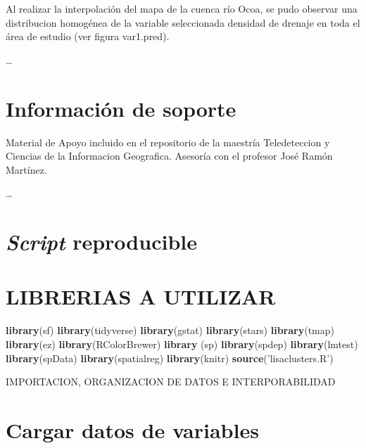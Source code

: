 \documentclass[11pt,]{article}
\newenvironment{Shaded}{\begin{snugshade}}{\end{snugshade}}
\newcommand{\KeywordTok}[1]{\textcolor[rgb]{0.13,0.29,0.53}{\textbf{#1}}}
\newcommand{\StringTok}[1]{\textcolor[rgb]{0.31,0.60,0.02}{#1}}
\newcommand{\NormalTok}[1]{#1}
\begin{document}
Al realizar la interpolación del mapa de la cuenca río Ocoa, se pudo
observar una distribucion homogénea de la variable seleccionada densidad
de drenaje en toda el área de estudio (ver figura var1.pred).

\ldots

\section{Información de soporte}\label{informaciuxf3n-de-soporte}

Material de Apoyo incluido en el repositorio de la maestría
Teledeteccion y Ciencias de la Informacion Geografica. Asesoría con el
profesor José Ramón Martínez.

\ldots

\section{\texorpdfstring{\emph{Script}
reproducible}{Script reproducible}}\label{script-reproducible}

\section{LIBRERIAS A UTILIZAR}\label{librerias-a-utilizar}

\begin{Shaded}
\begin{Highlighting}[]
\KeywordTok{library}\NormalTok{(sf)}
\KeywordTok{library}\NormalTok{(tidyverse)}
\KeywordTok{library}\NormalTok{(gstat)}
\KeywordTok{library}\NormalTok{(stars)}
\KeywordTok{library}\NormalTok{(tmap)}
\KeywordTok{library}\NormalTok{(ez)}
\KeywordTok{library}\NormalTok{(RColorBrewer)}
\KeywordTok{library}\NormalTok{ (sp)}
\KeywordTok{library}\NormalTok{(spdep) }
\KeywordTok{library}\NormalTok{(lmtest)}
\KeywordTok{library}\NormalTok{(spData)}
\KeywordTok{library}\NormalTok{(spatialreg)}
\KeywordTok{library}\NormalTok{(knitr)}
\KeywordTok{source}\NormalTok{(}\StringTok{'lisaclusters.R'}\NormalTok{)}
\end{Highlighting}
\end{Shaded}

IMPORTACION, ORGANIZACION DE DATOS E INTERPORABILIDAD

\section{Cargar datos de variables}\label{cargar-datos-de-variables}
\end{document}
